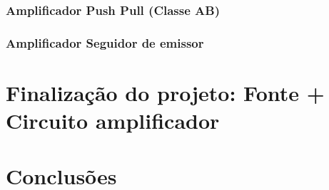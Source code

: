 \documentclass[a4paper,12pt,oneside,openany,table,xcdraw]{article}
\begin{document}
\subsubsection{Amplificador Push Pull (Classe AB)} %

\subsubsection{Amplificador Seguidor de emissor}


\newpage
\section{Finalização do projeto: Fonte + Circuito amplificador} \label{projeto-final}

\newpage
\section{Conclusões}
\end{document}
